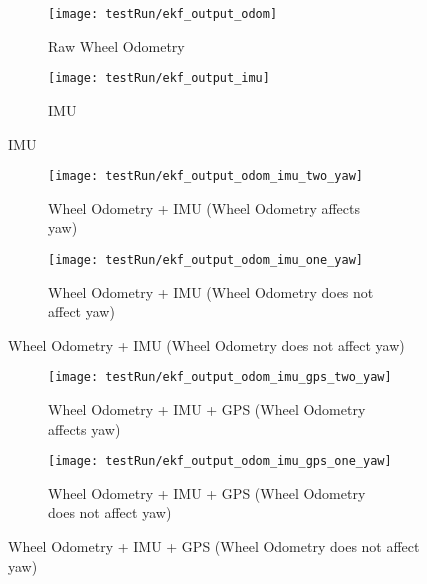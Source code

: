 \begin{figure}[p] 
	\caption{
		Filter Outputs For Different Sensor Fusions
	}
	\label{fig:ekfOutputs}
	\begin{subfigure}{\textwidth}
		\centering
		\texttt{[image: testRun/ekf\_output\_odom]}
		\caption{Raw Wheel Odometry}
		\label{figRouteOdom}
	\end{subfigure}
	\begin{subfigure}{\textwidth}
		\centering
		\texttt{[image: testRun/ekf\_output\_imu]}
		\caption{IMU}
		\label{figRouteImu}
	\end{subfigure}
\end{figure}

\begin{figure}[p] \ContinuedFloat
\begin{subfigure}{\textwidth}
	\centering
	\texttt{[image: testRun/ekf\_output\_odom\_imu\_two\_yaw]}
	\caption{Wheel Odometry + IMU (Wheel Odometry affects yaw)}
	\label{figRouteOdomImuTwoYaw}
\end{subfigure}
\begin{subfigure}{\textwidth}
	\centering
	\texttt{[image: testRun/ekf\_output\_odom\_imu\_one\_yaw]}
	\caption{Wheel Odometry + IMU (Wheel Odometry does not affect yaw)}
	\label{figRouteOdomImuOneYaw}
\end{subfigure}
	
\end{figure}

\begin{figure}[p] \ContinuedFloat
	\begin{subfigure}{\textwidth}
		\centering
		\texttt{[image: testRun/ekf\_output\_odom\_imu\_gps\_two\_yaw]}
		\caption{Wheel Odometry + IMU + GPS (Wheel Odometry affects yaw)}
		\label{figRouteOdomImuGpsTwoYaw}
	\end{subfigure}
	\begin{subfigure}{\textwidth}
		\centering
		\texttt{[image: testRun/ekf\_output\_odom\_imu\_gps\_one\_yaw]}
		\caption{Wheel Odometry + IMU + GPS (Wheel Odometry does not affect yaw)}
		\label{figRouteOdomImuGpsOneYaw}
	\end{subfigure}
\end{figure}
